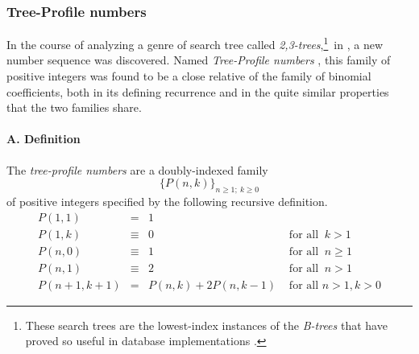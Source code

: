 \subsubsection{Tree-Profile numbers}
\label{sec:Tree-Profile-numbers}

In the course of analyzing a genre of search tree called {\it
  2,3-trees},\footnote{These search trees are the lowest-index
  instances of the {\it B-trees} that have proved so useful in database
  implementations \cite{CLRS}.}~in \cite{MillerPRS79,RosenbergS78}, a
new number sequence was discovered.
Named {\it Tree-Profile numbers} \cite{Rosenberg79}, this family of
positive integers was found to be a close relative of the family of
binomial coefficients, both in its defining recurrence and in the
quite similar properties that the two families share.

\paragraph{\small\sf A. Definition}

The {\it tree-profile numbers} are a doubly-indexed family
\[ \big\{ P(n,k) \big\}_{n \geq 1; \ k \geq 0}  \]
of positive integers specified by the following recursive definition.
\begin{equation}
\label{eq:TP-defn}
\begin{array}{ccll}
P(1,1) & =      & 1 & \\
P(1,k) & \equiv & 0 & \mbox{ for all } \ k > 1 \\
P(n,0) & \equiv & 1 & \mbox{ for all } \ n \geq 1 \\
P(n,1) & \equiv & 2 & \mbox{ for all } \ n > 1 \\
P(n+1, k+1) & = & P(n,k) + 2 P(n, k-1) & \mbox{ for all } n > 1, k > 0
\end{array}
\end{equation}

